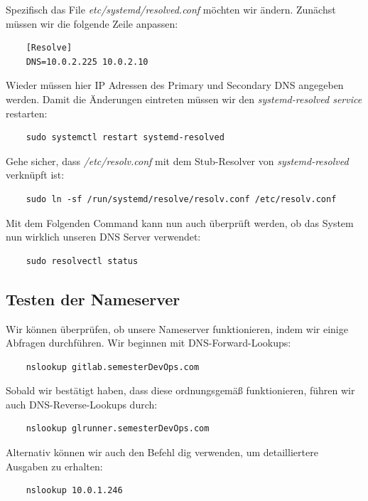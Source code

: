 \documentclass[a4paper,12pt]{article}
\begin{document}
Spezifisch das File \textit{etc/systemd/resolved.conf} möchten wir ändern.
Zunächst müssen wir die folgende Zeile anpassen:


\begin{verbatim}
	[Resolve]
	DNS=10.0.2.225 10.0.2.10
\end{verbatim}

Wieder müssen hier IP Adressen des Primary und Secondary DNS angegeben werden.
Damit die Änderungen eintreten müssen wir den \textit{systemd-resolved service} restarten:

\begin{verbatim}
	sudo systemctl restart systemd-resolved
\end{verbatim}

Gehe sicher, dass \textit{/etc/resolv.conf} mit dem Stub-Resolver von \textit{systemd-resolved} verknüpft ist:

\begin{verbatim}
	sudo ln -sf /run/systemd/resolve/resolv.conf /etc/resolv.conf
\end{verbatim}

Mit dem Folgenden Command kann nun auch überprüft werden, ob das System nun wirklich unseren DNS Server verwendet:

\begin{verbatim}
	sudo resolvectl status
\end{verbatim}

\subsection{Testen der Nameserver}
Wir können überprüfen, ob unsere Nameserver funktionieren, indem wir einige Abfragen durchführen. Wir beginnen mit DNS-Forward-Lookups:

\begin{verbatim}
	nslookup gitlab.semesterDevOps.com
\end{verbatim}

Sobald wir bestätigt haben, dass diese ordnungsgemäß funktionieren, führen wir auch DNS-Reverse-Lookups durch:


\begin{verbatim}
	nslookup glrunner.semesterDevOps.com
\end{verbatim}


Alternativ können wir auch den Befehl dig verwenden, um detailliertere Ausgaben zu erhalten:

\begin{verbatim}
	nslookup 10.0.1.246
\end{verbatim}
\end{document}
